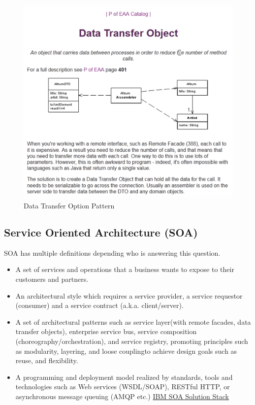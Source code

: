 \documentclass[../Main.tex]{subfiles}
\begin{document}
\begin{figure}[H]
    \centering
    \includegraphics[width=0.75\linewidth]{Images/data-transfer-object.png}
    \caption{Data Transfer Option Pattern}
\end{figure}
\newpage

\subsection{Service Oriented Architecture (SOA)}
SOA has multiple definitions depending who is answering this question.
\begin{itemize}
    \item A set of services and operations that a business wants to expose to their customers and partners.
    \item An architectural style which requires a service provider, a service 
    requestor (consumer) and a service contract (a.k.a. client/server).
    \item A set of architectural patterns such as service layer(with remote 
    facades, data transfer objects), enterprise service bus, service 
    composition (choreography/orchestration), and service registry, 
    promoting principles such as modularity, layering, and loose 
    couplingto achieve design goals such as reuse, and flexibility.
    \item A programming and deployment model realized by standards, 
    tools and technologies such as Web services (WSDL/SOAP), 
    RESTful HTTP, or asynchronous message queuing (AMQP etc.)
    \href{ibm.com}{IBM SOA Solution Stack}
\end{itemize}
\end{document}
